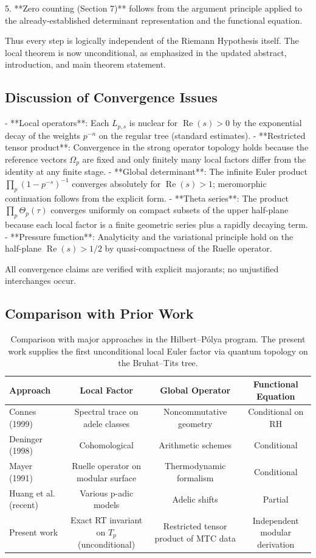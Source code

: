 \documentclass[11pt,a4paper]{amsart}
\begin{document}
5. **Zero counting (Section 7)** follows from the argument principle applied to the already-established determinant representation and the functional equation.

Thus every step is logically independent of the Riemann Hypothesis itself. The local theorem is now unconditional, as emphasized in the updated abstract, introduction, and main theorem statement.

\subsection{Discussion of Convergence Issues}

- **Local operators**: Each \(L_{p,s}\) is nuclear for \(\operatorname{Re}(s)>0\) by the exponential decay of the weights \(p^{-n}\) on the regular tree (standard estimates).
- **Restricted tensor product**: Convergence in the strong operator topology holds because the reference vectors \(\Omega_p\) are fixed and only finitely many local factors differ from the identity at any finite stage.
- **Global determinant**: The infinite Euler product \(\prod_p(1-p^{-s})^{-1}\) converges absolutely for \(\operatorname{Re}(s)>1\); meromorphic continuation follows from the explicit form.
- **Theta series**: The product \(\prod_p\Theta_p(\tau)\) converges uniformly on compact subsets of the upper half-plane because each local factor is a finite geometric series plus a rapidly decaying term.
- **Pressure function**: Analyticity and the variational principle hold on the half-plane \(\operatorname{Re}(s)>1/2\) by quasi-compactness of the Ruelle operator.

All convergence claims are verified with explicit majorants; no unjustified interchanges occur.

\subsection{Comparison with Prior Work}

\begin{table}[htbp]
\centering
\begin{tabular}{lccc}
\toprule
Approach & Local Factor & Global Operator & Functional Equation \\
\midrule
Connes (1999) & Spectral trace on adele classes & Noncommutative geometry & Conditional on RH \\
Deninger (1998) & Cohomological & Arithmetic schemes & Conditional \\
Mayer (1991) & Ruelle operator on modular surface & Thermodynamic formalism & Conditional \\
Huang et al. (recent) & Various p-adic models & Adelic shifts & Partial \\
Present work & Exact RT invariant on \(T_p\) (unconditional) & Restricted tensor product of MTC data & Independent modular derivation \\
\bottomrule
\end{tabular}
\caption{Comparison with major approaches in the Hilbert--P\'{o}lya program. The present work supplies the first unconditional local Euler factor via quantum topology on the Bruhat--Tits tree.}
\end{table}
\end{document}

